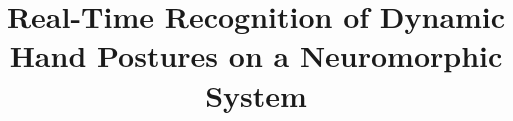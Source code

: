 \documentclass[journal]{journal}
\begin{document}
\title{Real-Time Recognition of Dynamic Hand Postures on a Neuromorphic System}

\maketitle
\thispagestyle{empty}

\begin{abstract}


\end{abstract}
\end{document}
